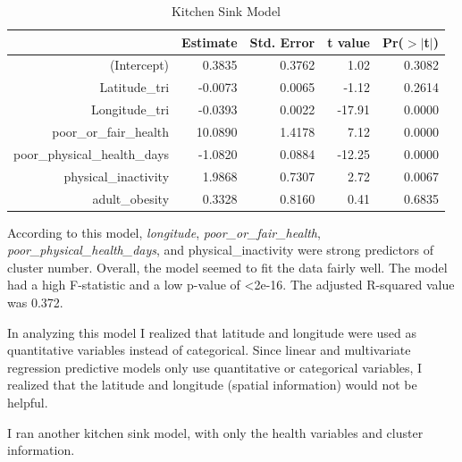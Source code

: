 \documentclass[12pt,twoside]{amherstthesis}
\begin{document}
  \begin{table}[ht]
  \centering
  \begin{tabular}{rrrrr}
    \hline
   & Estimate & Std. Error & t value & Pr($>$$|$t$|$) \\ 
    \hline
  (Intercept) & 0.3835 & 0.3762 & 1.02 & 0.3082 \\ 
    Latitude\_tri & -0.0073 & 0.0065 & -1.12 & 0.2614 \\ 
    Longitude\_tri & -0.0393 & 0.0022 & -17.91 & 0.0000 \\ 
    poor\_or\_fair\_health & 10.0890 & 1.4178 & 7.12 & 0.0000 \\ 
    poor\_physical\_health\_days & -1.0820 & 0.0884 & -12.25 & 0.0000 \\ 
    physical\_inactivity & 1.9868 & 0.7307 & 2.72 & 0.0067 \\ 
    adult\_obesity & 0.3328 & 0.8160 & 0.41 & 0.6835 \\ 
     \hline
  \end{tabular}
  \caption{Kitchen Sink Model} 
  \end{table}
  
  According to this model, \emph{longitude},
  \emph{poor\_or\_fair\_health}, \emph{poor\_physical\_health\_days}, and
  physical\_inactivity were strong predictors of cluster number. Overall,
  the model seemed to fit the data fairly well. The model had a high
  F-statistic and a low p-value of \textless{}2e-16. The adjusted
  R-squared value was 0.372.
  
  In analyzing this model I realized that latitude and longitude were used
  as quantitative variables instead of categorical. Since linear and
  multivariate regression predictive models only use quantitative or
  categorical variables, I realized that the latitude and longitude
  (spatial information) would not be helpful.
  
  \begin{Shaded}
  \end{Shaded}
  
  I ran another kitchen sink model, with only the health variables and
  cluster information.
  
\end{document}
